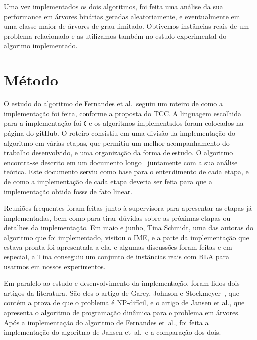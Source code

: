 \documentclass[a4paper,12pt]{article}
\begin{document}
Uma vez implementados os dois algoritmos, foi feita uma análise 
da sua performance em árvores binárias geradas aleatoriamente, e 
eventualmente em uma classe maior de árvores de grau limitado.
Obtivemos instâncias reais de um problema relacionado e as 
utilizamos também no estudo experimental do algorimo implementado.
 

\newpage



\section{Método}

O estudo do algoritmo de Fernandes et al.\ seguiu um roteiro de
como a implementação foi feita, conforme a proposta do TCC. 
A linguagem escolhida para a implementação foi \texttt{C} e os 
algoritmos implementados foram colocados na página do gitHub. 
O roteiro consistiu em uma divisão da implementação do algoritmo 
em várias etapas, que permitiu um melhor acompanhamento do 
trabalho desenvolvido, e uma organização da forma de estudo. 
O algoritmo encontra-se descrito em um documento 
longo~\cite{Schmidt15} juntamente com a sua análise teórica. 
Este documento serviu como base para o entendimento de cada 
etapa, e de como a implementação de cada etapa deveria ser feita 
para que a implementação obtida fosse de fato linear. 

Reuniões frequentes foram feitas junto à supervisora para 
apresentar as etapas já implementadas, bem como para tirar dúvidas 
sobre as próximas etapas ou detalhes da implementação. 
Em maio e junho, Tina Schmidt, uma das autoras do algoritmo que 
foi implementado, visitou o IME, e a parte da 
implementação que estava pronta foi apresentada a ela, e 
algumas discussões foram feitas e em especial, a Tina conseguiu
um conjunto de instâncias reais com BLA para usarmos em nossos
experimentos.   

Em paralelo ao estudo e desenvolvimento da implementação, foram 
lidos dois artigos da literatura. São eles o artigo de Garey, 
Johnson e Stockmeyer~\cite{GareyJS76}, que contém a prova de que o 
problema é NP-difícil, e o artigo de Jansen et al., que apresenta 
o algoritmo de programação dinâmica para o problema em árvores. 
Após a implementação do algoritmo de Fernandes et~al., foi feita 
a implementação do algoritmo de Jansen et~al.\ e a comparação dos 
dois. 
\end{document}

